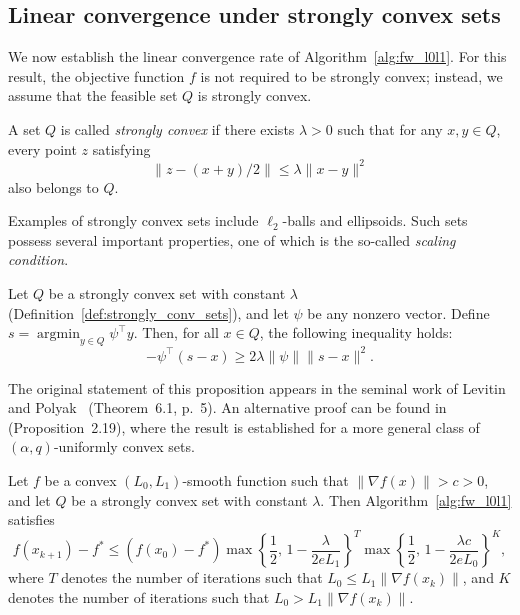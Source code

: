 \documentclass[runningheads]{llncs}
\begin{document}
	\subsection{Linear convergence under strongly convex sets}
	
	We now establish the linear convergence rate of Algorithm~\ref{alg:fw_l0l1}.  
	For this result, the objective function $f$ is not required to be strongly convex; instead, we assume that the feasible set $Q$ is strongly convex.
	
	\begin{definition}\label{def:strongly_conv_sets}
		A set $Q$ is called \emph{strongly convex} if there exists $\lambda > 0$ such that for any $x, y \in Q$, every point $z$ satisfying
		\[
		\| z - (x+y)/2 \| \leq \lambda \| x-y \|^2
		\]
		also belongs to $Q$.
	\end{definition}
	
	Examples of strongly convex sets include $\ell_2$-balls and ellipsoids.  
	Such sets possess several important properties, one of which is the so-called \emph{scaling condition}.
	
	\begin{proposition}\label{def:scaling_condition}
		Let $Q$ be a strongly convex set with constant $\lambda$ (Definition~\ref{def:strongly_conv_sets}), and let $\psi$ be any nonzero vector.  
		Define $s = \operatorname*{argmin}_{y \in Q} \psi^\top y$.  
		Then, for all $x \in Q$, the following inequality holds:
		\[
		- \psi^\top (s - x) \geq 2 \lambda \| \psi \| \| s - x \|^2.
		\]
	\end{proposition}
	
	The original statement of this proposition appears in the seminal work of Levitin and Polyak~\cite{levitin1966constrained} (Theorem~6.1, p.~5).  
	An alternative proof can be found in~\cite{braun2022conditional} (Proposition~2.19), where the result is established for a more general class of $(\alpha, q)$-uniformly convex sets.
	
	\begin{theorem}\label{th:linear_strong_conv_set}
		Let $f$ be a convex $(L_0, L_1)$-smooth function such that $\|\nabla f(x)\| > c > 0$, and let $Q$ be a strongly convex set with constant $\lambda$.  
		Then Algorithm~\ref{alg:fw_l0l1} satisfies
		\begin{equation*}
			f(x_{k+1}) - f^*
			\leq \left(f(x_0) - f^*\right)
			\max\left\lbrace \frac{1}{2},\, 1 - \frac{\lambda}{2 e L_1} \right\rbrace ^T
			\max\left\lbrace \frac{1}{2},\, 1 - \frac{\lambda c}{2 e L_0} \right\rbrace^K,
		\end{equation*}
		where $T$ denotes the number of iterations such that $L_0 \leq L_1 \|\nabla f(x_k)\|$, and $K$ denotes the number of iterations such that $L_0 > L_1 \|\nabla f(x_k)\|$.
	\end{theorem}
	
\end{document}
